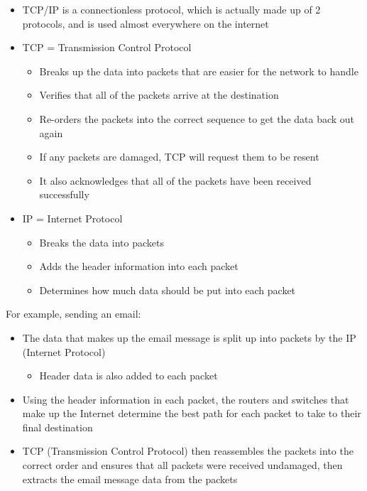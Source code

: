 \begin{itemize}
  \item TCP/IP is a connectionless protocol, which is actually made up of 2 protocols, and is used almost everywhere on the internet
  \item TCP = Transmission Control Protocol
  \begin{itemize}
    \item Breaks up the data into packets that are easier for the network to handle
    \item Verifies that all of the packets arrive at the destination
    \item Re-orders the packets into the correct sequence to get the data back out again
    \item If any packets are damaged, TCP will request them to be resent
    \item It also acknowledges that all of the packets have been received successfully
  \end{itemize}
  \item IP = Internet Protocol
  \begin{itemize}
    \item Breaks the data into packets
    \item Adds the header information into each packet
    \item Determines how much data should be put into each packet
  \end{itemize}
\end{itemize}
  
For example, sending an email:
\begin{itemize}
  \item The data that makes up the email message is split up into packets by the IP (Internet Protocol)
  \begin{itemize}
    \item Header data is also added to each packet
  \end{itemize}
  \item Using the header information in each packet, the routers and switches that make up the Internet determine the best path for each packet to take to their final destination
  \item TCP (Transmission Control Protocol) then reassembles the packets into the correct order and ensures that all packets were received undamaged, then extracts the email message data from the packets
\end{itemize}